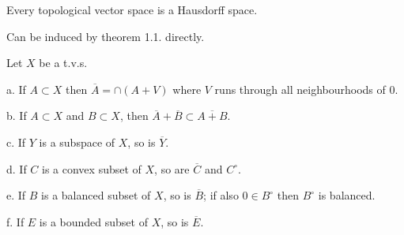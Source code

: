 \begin{theorem}
    Every topological vector space is a Hausdorff space.
\end{theorem}
Can be induced by theorem 1.1. directly.

\begin{theorem}
    Let $X$ be a t.v.s.\par
    a. If $A\subset X$ then $\overline{A} = \cap (A+V)$ where $V$ runs through all neighbourhoods of $0$.\par
    b. If $A\subset X$ and $B\subset X$, then $\overline{A} + \overline{B} \subset \overline{A+B}$.\par
    c. If $Y$ is a subspace of $X$, so is $\overline{Y}$.\par
    d. If $C$ is a convex subset of $X$, so are $\overline{C}$ and $C^{\circ}$.\par
    e. If $B$ is a balanced subset of $X$, so is $\overline{B}$; if also $0\in B^{\circ}$ then $B^{\circ}$ is balanced.\par
    f. If $E$ is a bounded subset of $X$, so is $\overline{E}$.
\end{theorem}
